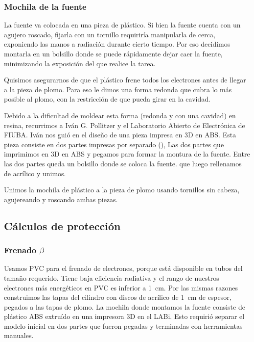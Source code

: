 \subsubsection{Mochila de la fuente}
La fuente va colocada en una pieza de plástico.
Si bien la fuente cuenta con un agujero roscado,
fijarla con un tornillo requiriría manipularla de cerca,
exponiendo las manos a radiación durante cierto tiempo.
Por eso decidimos montarla en un bolsillo donde se puede 
rápidamente dejar caer la fuente,
minimizando la exposición del que realice la tarea.

Quisimos asegurarnos de que el plástico frene todos los electrones antes de llegar a
la pieza de plomo. 
Para eso le dimos una forma redonda que cubra lo más posible al plomo,
con la restricción de que pueda girar en la cavidad.

Debido a la dificultad de moldear esta forma (redonda y con una cavidad)
en resina, recurrimos a Iván G. Pollitzer y el 
Laboratorio Abierto de Electrónica de FIUBA.
Iván nos guió en el diseño de una pieza impresa en 3D en ABS.
Esta pieza consiste en dos partes impresas por separado
(),
{Las dos partes que imprimimos en 3D en ABS y pegamos para formar la montura de
    la fuente.
Entre las dos partes queda un bolsillo donde se coloca la fuente.}
que luego rellenamos de acrílico y unimos.

Unimos la mochila de plástico a la pieza de plomo usando tornillos sin cabeza,
agujereando y roscando ambas piezas.
\subsection{Cálculos de protección}
\subsubsection{Frenado $\beta$}
Usamos PVC para el frenado de electrones, porque está disponible en tubos
del tamaño requerido.
Tiene baja eficiencia radiativa y el rango de nuestros electrones más
energéticos en PVC es inferior a \SI{1}{\centi\meter}.
Por las mismas razones construimos las tapas del cilindro con discos de
acrílico de \SI{1}{\centi\meter} de espesor,
pegados a las tapas de plomo.
La mochila donde montamos la fuente consiste de plástico ABS 
extruído en una impresora 3D en el LABi.
Esto requirió separar el modelo inicial en dos partes que fueron pegadas y
terminadas con herramientas manuales.
%
